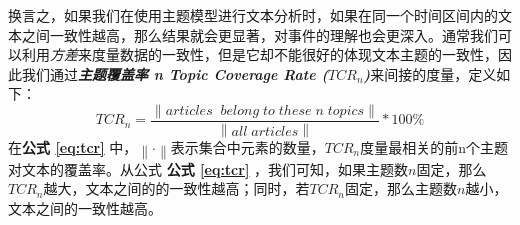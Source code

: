 换言之，如果我们在使用主题模型进行文本分析时，如果在同一个时间区间内的文本之间一致性越高，那么结果就会更显著，对事件的理解也会更深入。通常我们可以利用\emph{方差}来度量数据的一致性，但是它却不能很好的体现文本主题的一致性，因此我们通过\textbf{\emph{主题覆盖率 n Topic Coverage Rate ($TCR_n$)}}来间接的度量，定义如下：
\begin{equation}\label{eq:tcr}
TCR_n = \frac{\left \| articles\;\;belong\;to\;these\;n\;topics \right \|}{\left \| all\;articles \right \|} * 100\%
\end{equation}
在\textbf{公式 \ref{eq:tcr}} 中，$\left \| \cdot \right \|$表示集合中元素的数量，$TCR_n$度量最相关的前n个主题对文本的覆盖率。从公式 \textbf{公式 \ref{eq:tcr}} ，我们可知，如果主题数$n$固定，那么$TCR_n$越大，文本之间的的一致性越高；同时，若$TCR_n$固定，那么主题数$n$越小，文本之间的一致性越高。
























